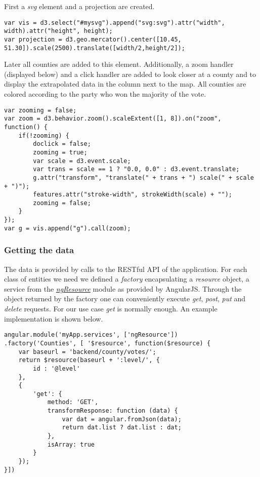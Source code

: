 First a \emph{svg} element and a projection are created.

\begin{lstlisting}
var vis = d3.select("#mysvg").append("svg:svg").attr("width", width).attr("height", height); 
var projection = d3.geo.mercator().center([10.45, 51.30]).scale(2500).translate([width/2,height/2]);
\end{lstlisting}


Later all counties are added to this element. Additionally, a zoom
handler (displayed below) and a click handler are added to look closer
at a county and to display the extrapolated data in the column next to
the map. All counties are colored according to the party who won the
majority of the vote.


\begin{lstlisting}
var zooming = false;
var zoom = d3.behavior.zoom().scaleExtent([1, 8]).on("zoom", function() {
    if(!zooming) {
        doclick = false;
        zooming = true;
        var scale = d3.event.scale;
        var trans = scale == 1 ? "0.0, 0.0" : d3.event.translate;
        g.attr("transform", "translate(" + trans + ") scale(" + scale + ")");
        features.attr("stroke-width", strokeWidth(scale) + "");
        zooming = false;
    }
});
var g = vis.append("g").call(zoom);
\end{lstlisting}


\subsubsection{Getting the data}\label{getting-the-data}

The data is provided by calls to the RESTful API of the application. For
each class of entities we need we defined a \emph{factory} encapsulating
a \emph{resource} object, a service from the
\href{http://docs.angularjs.org/api/ngResource}{\emph{ngResource}}
module as provided by AngularJS. Through the object returned by the
factory one can conveniently execute \emph{get}, \emph{post}, \emph{put}
and \emph{delete} requests. For our use case \emph{get} is normally
enough. An example implementation is shown below.



\begin{lstlisting}
angular.module('myApp.services', ['ngResource'])
.factory('Counties', [ '$resource', function($resource) {
	var baseurl = 'backend/county/votes/';
	return $resource(baseurl + ':level/', {
		id : '@level'
	},
    {
        'get': {
            method: 'GET',
            transformResponse: function (data) {
            	var dat = angular.fromJson(data);
            	return dat.list ? dat.list : dat;
            },
            isArray: true
        }
    });
}])
\end{lstlisting}

